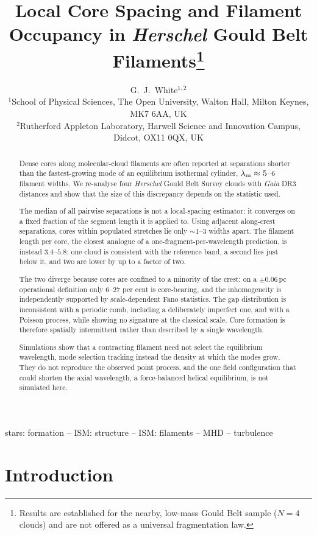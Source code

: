 \documentclass[usenatbib,twoside,twocolumn]{mnras}
\title[Core spacing and filament occupancy in HGBS filaments]{Local Core Spacing and Filament Occupancy in \textit{Herschel} Gould Belt Filaments\thanks{Results are established for the nearby, low-mass Gould Belt sample ($N=4$ clouds) and are not offered as a universal fragmentation law.}}
\author[G.~J.~White]{G.~J.~White$^{1,2}$\\
$^{1}$School of Physical Sciences, The Open University, Walton Hall, Milton Keynes, MK7 6AA, UK\\
$^{2}$Rutherford Appleton Laboratory, Harwell Science and Innovation Campus, Didcot, OX11 0QX, UK}
\begin{document}
\maketitle

\begin{abstract}
Dense cores along molecular-cloud filaments are often reported at separations shorter than the fastest-growing mode of an equilibrium isothermal cylinder, $\lambda_{\rm m}\approx5$--$6$ filament widths. We re-analyse four \textit{Herschel} Gould Belt Survey clouds with \textit{Gaia} DR3 distances and show that the size of this discrepancy depends on the statistic used.

The median of all pairwise separations is not a local-spacing estimator: it converges on a fixed fraction of the segment length it is applied to. Using adjacent along-crest separations, cores within populated stretches lie only $\sim1$--$3$ widths apart. The filament length per core, the closest analogue of a one-fragment-per-wavelength prediction, is instead $3.4$--$5.8$: one cloud is consistent with the reference band, a second lies just below it, and two are lower by up to a factor of two.

The two diverge because cores are confined to a minority of the crest: on a $\pm0.06$\,pc operational definition only $6$--$27$ per cent is core-bearing, and the inhomogeneity is independently supported by scale-dependent Fano statistics. The gap distribution is inconsistent with a periodic comb, including a deliberately imperfect one, and with a Poisson process, while showing no signature at the classical scale. Core formation is therefore spatially intermittent rather than described by a single wavelength.

Simulations show that a contracting filament need not select the equilibrium wavelength, mode selection tracking instead the density at which the modes grow. They do not reproduce the observed point process, and the one field configuration that could shorten the axial wavelength, a force-balanced helical equilibrium, is not simulated here.
\end{abstract}

\begin{keywords}
stars: formation -- ISM: structure -- ISM: filaments -- MHD -- turbulence
\end{keywords}

\section{Introduction}
\end{document}
